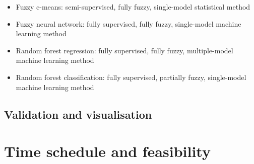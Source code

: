 \documentclass[a4paper,10pt]{article}
\begin{document}
\begin{itemize}
 \item Fuzzy c-means: semi-supervised, fully fuzzy, single-model statistical method
 \item Fuzzy neural network: fully supervised, fully fuzzy, single-model machine learning method
 \item Random forest regression: fully supervised, fully fuzzy, multiple-model machine learning method
 \item Random forest classification: fully supervised, partially fuzzy, single-model machine learning method
\end{itemize}

\subsection{Validation and visualisation}

\section{Time schedule and feasibility}


\end{document}
